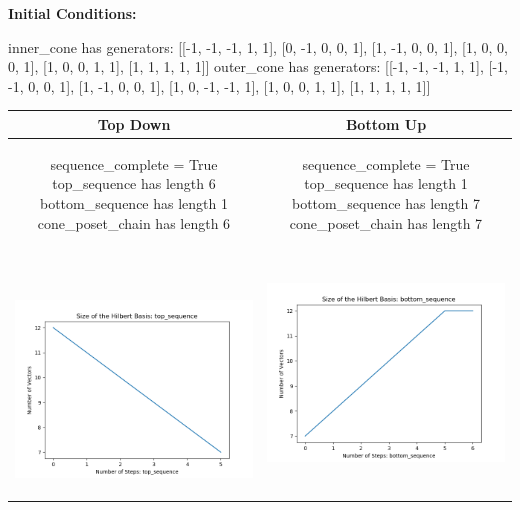 \documentclass[10pt]{article}
\begin{document}
\textbf{Initial Conditions:}
\begin{SAGE}
inner_cone has generators: 
[[-1, -1, -1, 1, 1], [0, -1, 0, 0, 1], [1, -1, 0, 0, 1], [1, 0, 0, 0, 1], [1, 0, 0, 1, 1], [1, 1, 1, 1, 1]]
outer_cone has generators: 
[[-1, -1, -1, 1, 1], [-1, -1, 0, 0, 1], [1, -1, 0, 0, 1], [1, 0, -1, -1, 1], [1, 0, 0, 1, 1], [1, 1, 1, 1, 1]]

\end{SAGE}
\begin{tabular}{c|c}
\textbf{Top Down} & \textbf{Bottom Up} \\ \hline  
\begin{SAGE}
	sequence_complete = True
	top_sequence has length 6
	bottom_sequence has length 1
	cone_poset_chain has length 6
\end{SAGE} 
&
\begin{SAGE}
	sequence_complete = True
	top_sequence has length 1
	bottom_sequence has length 7
	cone_poset_chain has length 7
\end{SAGE} 
\\ \hline
\
\begin{minipage}{.45\textwidth}
\includegraphics[width=\textwidth]{"DATA/5d/6 generators 1 bound E/top_sequence SIZE"}
\end{minipage} &
\begin{minipage}{.45\textwidth}
\includegraphics[width=\textwidth]{"DATA/5d/6 generators 1 bound E bottomup/bottom_sequence SIZE"}

\end{minipage}
\end{tabular}
\end{document}
